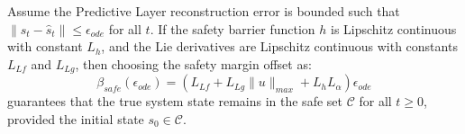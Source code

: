 \documentclass[manuscript, screen, review]{jair}
\begin{document}
\begin{theorem}\label{thm:safety_guarantee}
Assume the Predictive Layer reconstruction error is bounded such that $\|s_t - \hat{s}_t\| \le \epsilon_{ode}$ for all $t$. If the safety barrier function $h$ is Lipschitz continuous with constant $L_h$, and the Lie derivatives are Lipschitz continuous with constants $L_{Lf}$ and $L_{Lg}$, then choosing the safety margin offset as:
\begin{equation}
    \beta_{safe}(\epsilon_{ode}) = \left( L_{Lf} + L_{Lg} \|u\|_{max} + L_h L_\alpha \right) \epsilon_{ode}
\end{equation}
guarantees that the true system state remains in the safe set $\mathcal{C}$ for all $t \ge 0$, provided the initial state $s_0 \in \mathcal{C}$.
\end{theorem}
\end{document}
